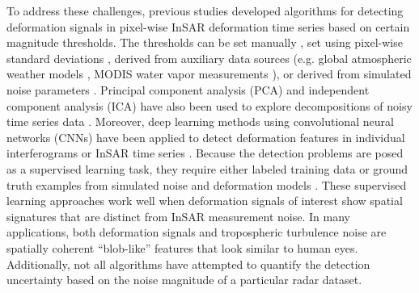 To address these challenges, previous studies developed algorithms for detecting deformation signals in pixel-wise InSAR deformation time series based on certain magnitude thresholds. The thresholds can be set manually \citep{Raspini2018ContinuousSemiAutomatic}, set using pixel-wise standard deviations \citep{Bekaert2020InsarBasedDetection}, derived from auxiliary data sources (e.g. global atmospheric weather models \citep{Parker2015SystematicAssessmentAtmospheric}, MODIS water vapor measurements \citep{Barnhart2013CharacterizingEstimatingNoise}), or derived from simulated noise parameters \citep{Havazli2021DetectionThresholdEstimates}. Principal component analysis (PCA) and independent component analysis (ICA) have also been used to explore decompositions of noisy time series data \citep{Chaussard2014PredictabilityHydraulicHead, Ebmeier2016ApplicationIndependentComponent, Gaddes2018BlindSignalSeparation}. Moreover, deep learning methods using convolutional neural networks (CNNs) have been applied to detect deformation features in individual interferograms \citep{Anantrasirichai2018ApplicationMachineLearning, Anantrasirichai2019ApplicationConvolutionalNeural} or InSAR time series \citep{RouetLeduc2021AutonomousExtractionMillimeter}. Because the detection problems are posed as a supervised learning task, they require either labeled training data \citep{Anantrasirichai2018ApplicationMachineLearning} or ground truth examples from simulated noise and deformation models \citep{Anantrasirichai2019DeepLearningApproach, RouetLeduc2021AutonomousExtractionMillimeter}. These supervised learning approaches work well when deformation signals of interest show spatial signatures that are distinct from InSAR measurement noise. In many applications, both deformation signals and tropospheric turbulence noise are spatially coherent ``blob-like'' features that look similar to human eyes.
Additionally, not all algorithms have attempted to quantify the detection uncertainty based on the noise magnitude of a particular radar dataset. 




